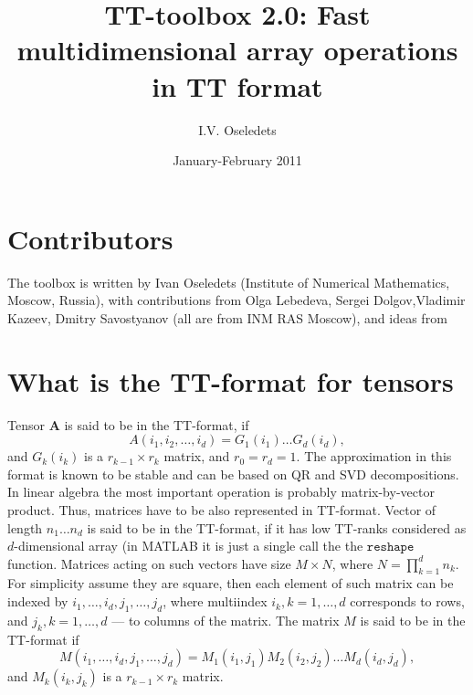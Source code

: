 \documentclass[a4paper,12pt,twoside]{article}
\date{January-February 2011}
\title{TT-toolbox 2.0: Fast multidimensional array operations in TT format }
\author{I.V. Oseledets}
\def\A{{\mathbf{A}}}
\begin{document}
\maketitle

\section{Contributors}
  The toolbox is written by Ivan Oseledets (Institute of Numerical Mathematics, Moscow, Russia), 
with contributions from Olga Lebedeva, Sergei Dolgov,Vladimir Kazeev, Dmitry Savostyanov (all are from INM RAS Moscow),
and ideas from  
\section{What is the TT-format for tensors}
Tensor $\A$ is said to be in the TT-format, if 
$$A(i_1,i_2,\ldots,i_d) = G_1(i_1) \ldots G_d(i_d),$$
and $G_k(i_k)$ is a $r_{k-1} \times r_k$ matrix, and $r_0 =r_d = 1$.  The approximation in this format is known to be
stable and can be based on QR and SVD decompositions. In linear algebra the most important operation
is probably matrix-by-vector product. Thus, matrices have to be also represented in TT-format.
Vector of length $n_1 \ldots n_d$ is said to be in the TT-format, if it has low TT-ranks considered
as $d$-dimensional array (in MATLAB it is just a single call the the $\texttt{reshape}$ function. 
Matrices acting on such vectors have size $M \times N$, where $N=\prod_{k=1}^d n_k$. For simplicity
assume they are square, then each element of such matrix can be indexed by $i_1,\ldots,i_d, j_1,\ldots,j_d$,
where multiindex $i_k, k=1,\ldots,d$ corresponds to rows, and $j_k,k=1,\ldots,d$ --- to columns of the
matrix. The matrix $M$ is said to be in the TT-format if 
$$M(i_1,\ldots,i_d,j_1,\ldots,j_d) = M_1(i_1,j_1) M_2(i_2,j_2) \ldots M_d(i_d,j_d),$$
and $M_k(i_k,j_k)$ is a $r_{k-1} \times r_k$ matrix. 
\end{document}
